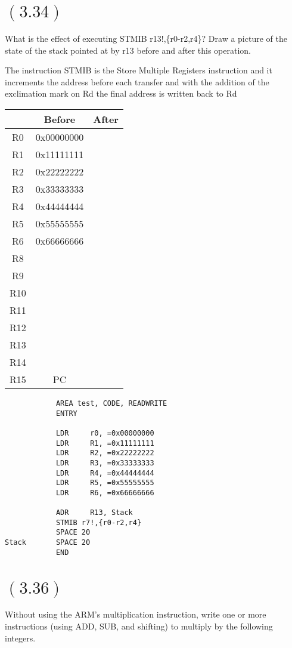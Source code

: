 \documentclass[letterpaper,12pt,titlepage]{article}
\begin{document}
\section*{$(3.34)$} What is the effect of executing STMIB r13!,\{r0-r2,r4\}? Draw a picture of the state of the stack pointed at by r13 before and after this operation.
\begin{mdframed}[style=MyFrame]

The instruction STMIB is the Store Multiple Registers instruction and it increments the address before each transfer and with the addition of the exclimation mark on Rd the final address is written back to Rd \\

\begin{center}
\begin{tabular}{| c | c | c |}
\hline
& Before & After\\ \hline \hline
R0 & 0x00000000  &\\ \hline
R1 & 0x11111111  &\\ \hline
R2 & 0x22222222  &\\ \hline
R3 & 0x33333333  &\\ \hline
R4 & 0x44444444  &\\ \hline
R5 & 0x55555555  &\\ \hline
R6 & 0x66666666  &\\ \hline
R8 &  &\\ \hline
R9 &  &\\ \hline
R10 &  &\\ \hline
R11 &  &\\ \hline 
R12 &  &\\ \hline
R13 &  &\\ \hline
R14 &  &\\ \hline
R15 & PC&\\ \hline
\end{tabular}
\end{center}
\begin{verbatim}
			AREA test, CODE, READWRITE	
			ENTRY
			
			LDR 	r0, =0x00000000
			LDR		R1, =0x11111111
			LDR		R2, =0x22222222
			LDR		R3, =0x33333333
			LDR		R4, =0x44444444
			LDR		R5, =0x55555555
			LDR		R6, =0x66666666
			
			ADR 	R13, Stack
			STMIB r7!,{r0-r2,r4}
			SPACE 20
Stack		SPACE 20
			END
\end{verbatim}
\end{mdframed}

\newpage
\section*{$(3.36)$} Without using the ARM's multiplication instruction, write one or more instructions (using ADD, SUB, and shifting) to multiply by the following integers.
\end{document}
